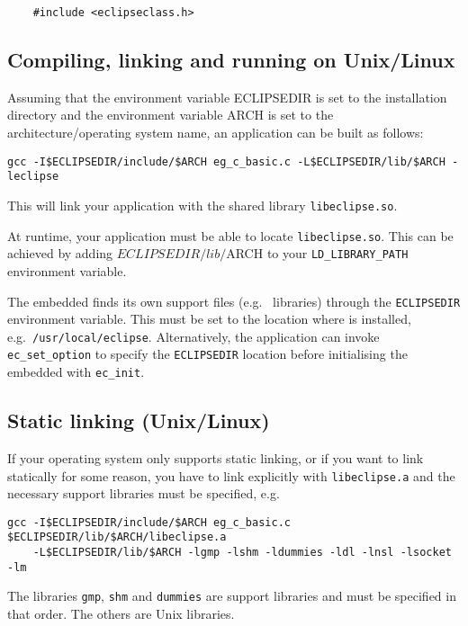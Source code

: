 \begin{verbatim}
    #include <eclipseclass.h>
\end{verbatim}



\subsection{Compiling, linking and running on Unix/Linux}

Assuming that the environment variable ECLIPSEDIR is set to the
{\eclipse} installation directory and the environment variable ARCH is set to
the architecture/operating system name,
an application can be built as follows:
\begin{verbatim}
gcc -I$ECLIPSEDIR/include/$ARCH eg_c_basic.c -L$ECLIPSEDIR/lib/$ARCH -leclipse
\end{verbatim}
This will link your application with the shared library \verb+libeclipse.so+.

At runtime, your application must be able to locate \verb+libeclipse.so+.
This can be achieved by adding $ECLIPSEDIR/lib/$ARCH to your
\verb+LD_LIBRARY_PATH+ environment variable.

The embedded {\eclipse} finds its own support files (e.g.\ {\eclipse} libraries)
through the \verb+ECLIPSEDIR+ environment variable.
This must be set to the location where {\eclipse} is installed,
e.g.\ \verb+/usr/local/eclipse+.
Alternatively, the application can invoke \verb+ec_set_option+ to specify
the \verb+ECLIPSEDIR+ location before initialising the embedded {\eclipse}
with \verb+ec_init+.


\subsection{Static linking (Unix/Linux)}

If your operating system only supports static linking, or if you want
to link statically for some reason, you have to link explicitly with
\verb+libeclipse.a+ and the necessary support libraries must be specified, e.g.
\begin{verbatim}
gcc -I$ECLIPSEDIR/include/$ARCH eg_c_basic.c $ECLIPSEDIR/lib/$ARCH/libeclipse.a
    -L$ECLIPSEDIR/lib/$ARCH -lgmp -lshm -ldummies -ldl -lnsl -lsocket -lm
\end{verbatim}
The libraries \verb+gmp+, \verb+shm+ and \verb+dummies+ are {\eclipse}
support libraries and must be specified in that order.
The others are Unix libraries.

